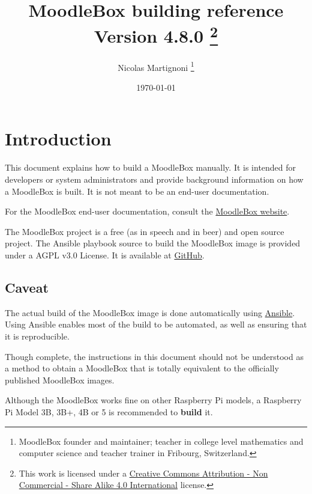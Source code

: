 \documentclass[12pt]{article}
\begin{document}
\title{MoodleBox building reference\\Version 4.8.0%
  \footnote{This work is licensed under a \href{http://creativecommons.org/licenses/by-nc-sa/4.0/}{Creative Commons Attribution - Non Commercial - Share Alike  4.0 International} license.}%
}
\date{\today} %
\author{Nicolas Martignoni%
  \footnote{MoodleBox founder and maintainer; teacher in college level mathematics and computer science and teacher trainer in Fribourg, Switzerland.}%
}
\maketitle

\begingroup
\setlength{\parskip}{3pt plus1pt minus1pt}
\tableofcontents
\endgroup
\clearpage

\section{Introduction}

This document explains how to build a MoodleBox manually.
It is intended for developers or system administrators and provide background information on how a MoodleBox is built.
It is not meant to be an end-user documentation.

For the MoodleBox end-user documentation, consult the \href{https://moodlebox.net/}{MoodleBox website}.

The MoodleBox project is a free (as in speech and in beer) and open source project. The Ansible playbook source to build the MoodleBox image is provided under a AGPL v3.0 License. It is available at \href{https://github.com/moodlebox/moodlebox}{GitHub}.

\subsection{Caveat}

The actual build of the MoodleBox image is done automatically using \href{https://www.ansible.com/}{Ansible}.
Using Ansible enables most of the build to be automated, as well as ensuring that it is reproducible.

Though complete, the instructions in this document should not be understood as a method to obtain a MoodleBox that is totally equivalent to the officially published MoodleBox images.

Although the MoodleBox works fine on other Raspberry Pi models, a Raspberry Pi Model 3B, 3B+, 4B or 5 is recommended to \textbf{build} it.
\end{document}
